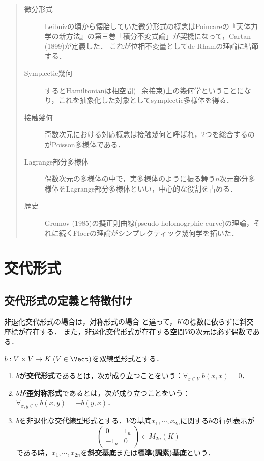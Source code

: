 \documentclass[uplatex,dvipdfmx]{jsreport}
\begin{document}
\begin{quotation}
    \begin{description}
        \item[微分形式] Leibnizの頃から懐胎していた微分形式の概念はPoincareの『天体力学の新方法』の第三巻「積分不変式論」が契機になって，Cartan (1899)が定義した．
        これが位相不変量としてde Rhamの理論に結節する．
        \item[Symplectic幾何] するとHamiltonianは相空間(=余接束)上の幾何学ということになり，これを抽象化した対象としてsymplectic多様体を得る．
        \item[接触幾何] 奇数次元における対応概念は接触幾何と呼ばれ，2つを総合するのがPoisson多様体である．
        \item[Lagrange部分多様体] 偶数次元の多様体の中で，実多様体のように振る舞う$n$次元部分多様体をLagrange部分多様体といい，中心的な役割を占める．
        \item[歴史] Gromov (1985)の擬正則曲線(pseudo-holomogrphic curve)の理論，それに続くFloerの理論がシンプレクティック幾何学を拓いた．   
    \end{description}
\end{quotation}

\section{交代形式}

\subsection{交代形式の定義と特徴付け}

\begin{tcolorbox}[colframe=ForestGreen, colback=ForestGreen!10!white, breakable]
    非退化交代形式の場合は，対称形式の場合
    と違って，$K$の標数に依らずに斜交座標が存在する．
    また，非退化交代形式が存在する空間$V$の次元は必ず偶数である．
\end{tcolorbox}

\begin{definition}
    $b:V\times V\to K\;(V\in\Vect)$を双線型形式とする．
    \begin{enumerate}
        \item $b$が\textbf{交代形式}であるとは，次が成り立つことをいう：$\forall_{ x\in V}\;b(x,x)=0$．
        \item $b$が\textbf{歪対称形式}であるとは，次が成り立つことをいう：$\forall_{x,y\in V}\;b(x,y)=-b(y,x)$．
        \item $b$を非退化な交代線型形式とする．$V$の基底$x_1,\cdots,x_{2n}$に関する$b$の行列表示が
        \[\begin{pmatrix}0&1_n\\-1_n&0\end{pmatrix}\in M_{2n}(K)\]
        である時，$x_1,\cdots,x_{2n}$を\textbf{斜交基底}または\textbf{標準(調素)基底}という．
    \end{enumerate}
\end{definition}
\end{document}
